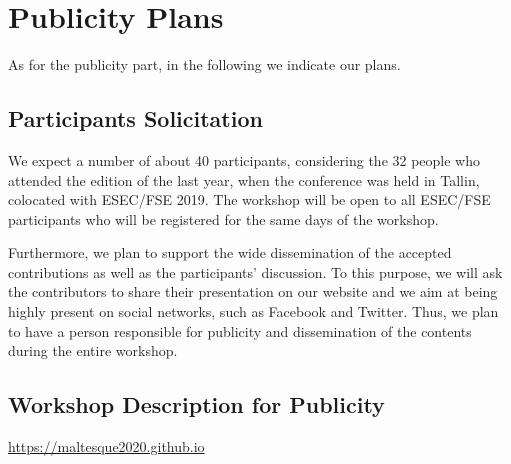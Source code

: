 
\section{Publicity Plans}

As for the publicity part, in the following we indicate our plans.

\subsection{Participants Solicitation}

We expect a number of about 40 participants, considering the 32 people who attended the edition of the last year, when the conference was held in Tallin, colocated with ESEC/FSE 2019.
The workshop will be open to all ESEC/FSE participants who will be registered for the same days of the workshop.

Furthermore, we plan to support the wide dissemination of the accepted contributions as well as the participants’ discussion.
To this purpose, we will ask the contributors to share their presentation on our website and we aim at being highly present on social networks, such as Facebook and Twitter.
Thus, we plan to have a person responsible for publicity and dissemination of the contents during the entire workshop.

\subsection{Workshop Description for Publicity}

\url{https://maltesque2020.github.io}

